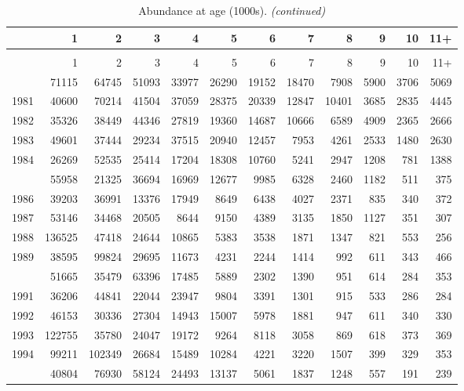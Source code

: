 \documentclass[
]{article}
\begin{document}
\begin{longtable}[t]{lrrrrrrrrrrr}
\caption{\label{tab:NAA-table}Abundance at age (1000s).}\\
\toprule
  & 1 & 2 & 3 & 4 & 5 & 6 & 7 & 8 & 9 & 10 & 11+\\
\midrule
\endfirsthead
\caption[]{Abundance at age (1000s). \textit{(continued)}}\\
\toprule
  & 1 & 2 & 3 & 4 & 5 & 6 & 7 & 8 & 9 & 10 & 11+\\
\midrule
\endhead

\endfoot
\bottomrule
\endlastfoot
1980 & 71115 & 64745 & 51093 & 33977 & 26290 & 19152 & 18470 & 7908 & 5900 & 3706 & 5069\\
1981 & 40600 & 70214 & 41504 & 37059 & 28375 & 20339 & 12847 & 10401 & 3685 & 2835 & 4445\\
1982 & 35326 & 38449 & 44346 & 27819 & 19360 & 14687 & 10666 & 6589 & 4909 & 2365 & 2666\\
1983 & 49601 & 37444 & 29234 & 37515 & 20940 & 12457 & 7953 & 4261 & 2533 & 1480 & 2630\\
1984 & 26269 & 52535 & 25414 & 17204 & 18308 & 10760 & 5241 & 2947 & 1208 & 781 & 1388\\
\addlinespace
1985 & 55958 & 21325 & 36694 & 16969 & 12677 & 9985 & 6328 & 2460 & 1182 & 511 & 375\\
1986 & 39203 & 36991 & 13376 & 17949 & 8649 & 6438 & 4027 & 2371 & 835 & 340 & 372\\
1987 & 53146 & 34468 & 20505 & 8644 & 9150 & 4389 & 3135 & 1850 & 1127 & 351 & 307\\
1988 & 136525 & 47418 & 24644 & 10865 & 5383 & 3538 & 1871 & 1347 & 821 & 553 & 256\\
1989 & 38595 & 99824 & 29695 & 11673 & 4231 & 2244 & 1414 & 992 & 611 & 343 & 466\\
\addlinespace
1990 & 51665 & 35479 & 63396 & 17485 & 5889 & 2302 & 1390 & 951 & 614 & 284 & 353\\
1991 & 36206 & 44841 & 22044 & 23947 & 9804 & 3391 & 1301 & 915 & 533 & 286 & 284\\
1992 & 46153 & 30336 & 27304 & 14943 & 15007 & 5978 & 1881 & 947 & 611 & 340 & 330\\
1993 & 122755 & 35780 & 24047 & 19172 & 9264 & 8118 & 3058 & 869 & 618 & 373 & 369\\
1994 & 99211 & 102349 & 26684 & 15489 & 10284 & 4221 & 3220 & 1507 & 399 & 329 & 353\\
\addlinespace
1995 & 40804 & 76930 & 58124 & 24493 & 13137 & 5061 & 1837 & 1248 & 557 & 191 & 239\\

\end{longtable}
\end{document}

